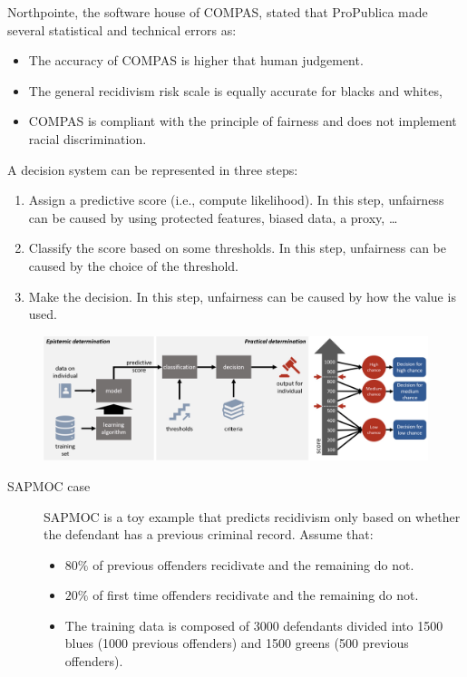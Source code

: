 \begin{example}
\begin{description}
            Northpointe, the software house of COMPAS, stated that ProPublica made several statistical and technical errors as:
            \begin{itemize}
                \item The accuracy of COMPAS is higher that human judgement.
                \item The general recidivism risk scale is equally accurate for blacks and whites,
                \item COMPAS is compliant with the principle of fairness and does not implement racial discrimination.
            \end{itemize}
    \end{description}

    \indenttbox
    \begin{remark}
        A decision system can be represented in three steps:
        \begin{enumerate}
            \item Assign a predictive score (i.e., compute likelihood). In this step, unfairness can be caused by using protected features, biased data, a proxy, \dots
            \item Classify the score based on some thresholds. In this step, unfairness can be caused by the choice of the threshold.
            \item Make the decision. In this step, unfairness can be caused by how the value is used.
        \end{enumerate}
        \begin{figure}[H]
            \centering
            \includegraphics[width=0.8\linewidth]{./img/decision_anatomy.png}
        \end{figure}
    \end{remark}

    \begin{description}
        \item[SAPMOC case]
            SAPMOC is a toy example that predicts recidivism only based on whether the defendant has a previous criminal record. Assume that:
            \begin{itemize}
                \item $80\%$ of previous offenders recidivate and the remaining do not.
                \item $20\%$ of first time offenders recidivate and the remaining do not.
                \item The training data is composed of 3000 defendants divided into 1500 blues (1000 previous offenders) and 1500 greens (500 previous offenders).
            \end{itemize}


\end{description}
\end{example}
